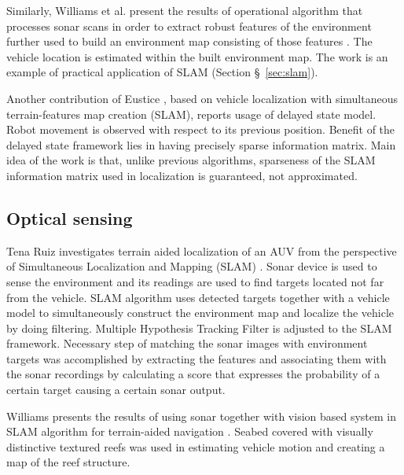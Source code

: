 Similarly, Williams et al. present the results of operational algorithm that processes sonar scans in order to extract robust features of the environment further used to build an environment map consisting of those features \cite{williams00}. The vehicle location is estimated within the built environment map. The work is an example of practical application of SLAM (Section \S~\ref{sec:slam}).

Another contribution of Eustice \cite{eustice05exactly}, based on vehicle localization with simultaneous terrain-features map creation (SLAM), reports usage of delayed state model. Robot movement is observed with respect to its previous position. Benefit of the delayed state framework lies in having precisely sparse information matrix. Main idea of the work is that, unlike previous algorithms, sparseness of the SLAM information matrix used in localization is guaranteed, not approximated.
\subsection{Optical sensing}
Tena Ruiz investigates terrain aided localization of an AUV from the perspective of Simultaneous Localization and Mapping (SLAM) \cite{ruiz01}. Sonar device is used to sense the environment and its readings are used to find targets located not far from the vehicle. SLAM algorithm uses detected targets together with a vehicle model to simultaneously construct the environment map and localize the vehicle by doing filtering. Multiple Hypothesis Tracking Filter is adjusted to the SLAM framework. Necessary step of matching the sonar images with environment targets was accomplished by extracting the features and associating them with the sonar recordings by calculating a score that expresses the probability of a certain target causing a certain sonar output. 

Williams presents the results of using sonar together with vision based system in SLAM algorithm for terrain-aided navigation \cite{williams04}. Seabed covered with visually distinctive textured reefs was used in estimating vehicle motion and creating a map of the reef structure.  

